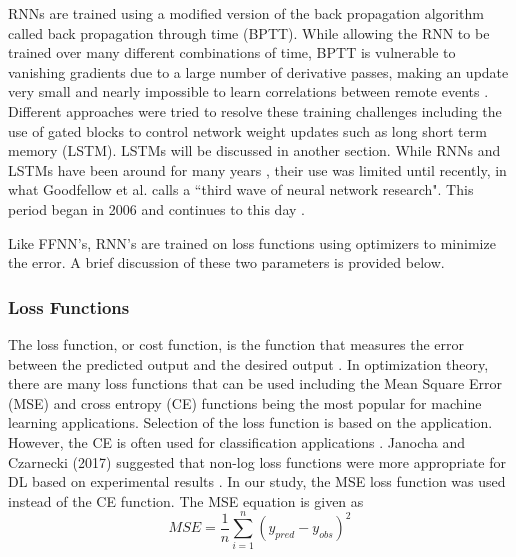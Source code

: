 RNNs are trained using a modified version of the back propagation algorithm called back propagation through time (BPTT). While allowing the RNN to be trained over many different combinations of time, BPTT is vulnerable to vanishing gradients due to a large number of derivative passes, making an update very small and nearly impossible to learn correlations between remote events \citep{Pascanu2013, Graves2013a}. Different approaches were tried to resolve these training challenges including the use of gated blocks to control network weight updates such as long short term memory (LSTM). LSTMs will be discussed in another section. While RNNs and LSTMs have been around for many years \cite{Hochreiter1997}, their use was limited until recently, in what Goodfellow et al. calls a ``third wave of neural network research". This period began in 2006 and continues to this day \citep{Goodfellow2016}.

Like FFNN's, RNN's are trained on loss functions using optimizers to minimize the error. A brief discussion of these two parameters is provided below.

\subsubsection{Loss Functions}

The loss function, or cost function, is the function that measures the error between the predicted output and the desired output \citep{Goodfellow2016}. In optimization theory, there are many loss functions that can be used including the Mean Square Error (MSE) and cross entropy (CE) functions being the most popular for machine learning applications.  Selection of the loss function is based on the application. However, the CE is often used for classification applications \citep{Kline2005, Wu2017}. Janocha and Czarnecki (2017) suggested that non-log loss functions were more appropriate for DL based on experimental results \citep{Janocha2017}. In our study, the MSE loss function was used instead of the CE function. The MSE equation is given as 
%
\begin{equation}
\label{eq:MSE}
MSE = \frac{1}{n} \sum_{i=1}^{n} \left( y_{pred} - y_{obs} \right)^{2}
\end{equation}
%
